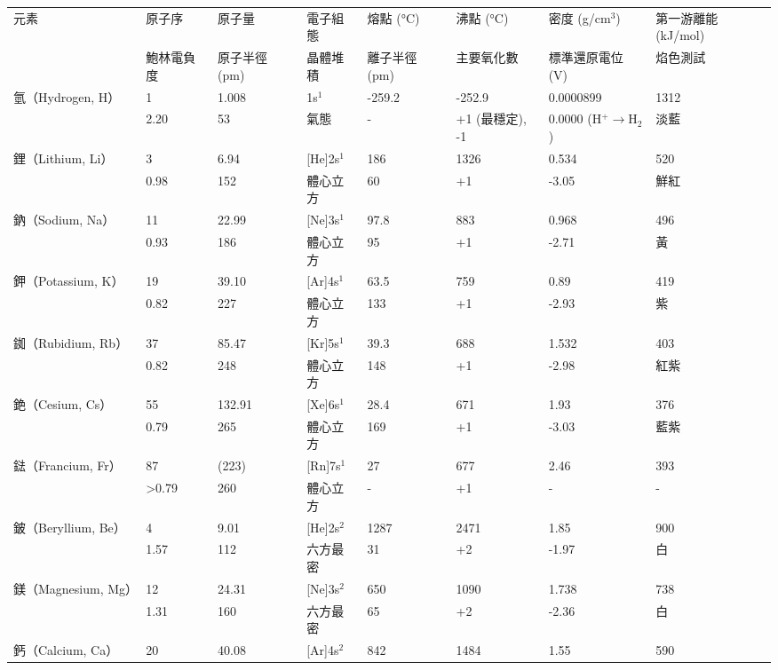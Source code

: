 \documentclass[a4paper,12pt]{report}
\begin{document}
\begin{longtable}[c]{|p{}|p{}|p{}|p{}|p{}|p{}|p{}|p{}|}
\hline
元素 & 原子序 & 原子量 & 電子組態 & 熔點 (°C) & 沸點 (°C) & 密度 (g/cm$^3$) & 第一游離能 (kJ/mol)\\\cline{2-8}
& 鮑林電負度 & 原子半徑 (pm) & 晶體堆積 & 離子半徑 (pm) & 主要氧化數 & 標準還原電位 (V) & 焰色測試\\\hline
\endhead
氫（Hydrogen, H） & 1 & 1.008 & 1s$^1$ & -259.2 & -252.9 & 0.0000899 & 1312\\\cline{2-8}
& 2.20 & 53 & 氣態 & - & +1 (最穩定), -1 & 0.0000 (H$^+\to$H$_2$) & 淡藍\\\hline
鋰（Lithium, Li） & 3 & 6.94 & [He]2s$^1$ & 186 & 1326 & 0.534 & 520\\\cline{2-8}
& 0.98 & 152 & 體心立方 & 60 & +1 & -3.05 & 鮮紅\\\hline
鈉（Sodium, Na） & 11 & 22.99 & [Ne]3s$^1$ & 97.8 & 883 & 0.968 & 496\\\cline{2-8}
& 0.93 & 186 & 體心立方 & 95 & +1 & -2.71 & 黃\\\hline
鉀（Potassium, K） & 19 & 39.10 & [Ar]4s$^1$ & 63.5 & 759 & 0.89 & 419\\\cline{2-8}
& 0.82 & 227 & 體心立方 & 133 & +1 & -2.93 & 紫\\\hline
銣（Rubidium, Rb） & 37 & 85.47 & [Kr]5s$^1$ & 39.3 & 688 & 1.532 & 403\\\cline{2-8}
& 0.82 & 248 & 體心立方 & 148 & +1 & -2.98 & 紅紫\\\hline
銫（Cesium, Cs） & 55 & 132.91 & [Xe]6s$^1$ & 28.4 & 671 & 1.93 & 376\\\cline{2-8}
& 0.79 & 265 & 體心立方 & 169 & +1 & -3.03 & 藍紫\\\hline
鍅（Francium, Fr） & 87 & (223) & [Rn]7s$^1$ & 27 & 677 & 2.46 & 393\\\cline{2-8}
& >0.79 & 260 & 體心立方 & - & +1 & - & -\\\hline
鈹（Beryllium, Be） & 4 & 9.01 & [He]2s$^2$ & 1287 & 2471 & 1.85 & 900\\\cline{2-8}
& 1.57 & 112 & 六方最密 & 31 & +2 & -1.97 & 白\\\hline
鎂（Magnesium, Mg） & 12 & 24.31 & [Ne]3s$^2$ & 650 & 1090 & 1.738 & 738\\\cline{2-8}
& 1.31 & 160 & 六方最密 & 65 & +2 & -2.36 & 白\\\hline
鈣（Calcium, Ca） & 20 & 40.08 & [Ar]4s$^2$ & 842 & 1484 & 1.55 & 590\\\cline{2-8}

\end{longtable}
\end{document}
